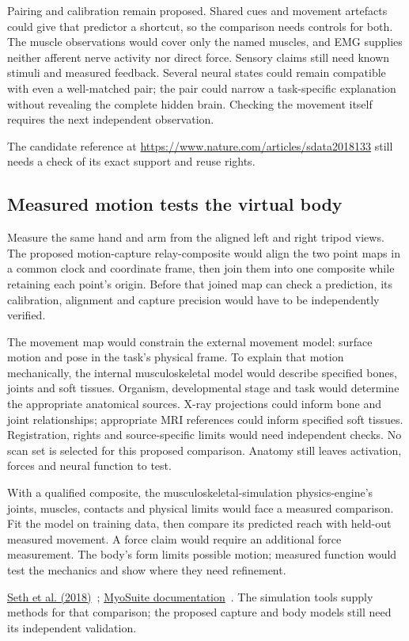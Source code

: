 Pairing and calibration remain proposed. Shared cues and movement artefacts
could give that predictor a shortcut, so the comparison needs controls for
both. The muscle observations would cover only the named muscles, and EMG
supplies neither afferent nerve activity nor direct force. Sensory claims
still need known stimuli and measured feedback. Several neural states could
remain compatible with even a well-matched pair; the pair could narrow a
task-specific explanation without revealing the complete hidden brain.
Checking the movement itself requires the next independent observation.
\par\noindent The candidate reference at \url{https://www.nature.com/articles/sdata2018133} still needs a check of its exact support and reuse rights.

\subsection{Measured motion tests the virtual body}
Measure the same hand and arm from the aligned left and right tripod views.
The proposed motion-capture relay-composite would align the two point maps
in a common clock and coordinate frame, then join them into one composite
while retaining each point's origin. Before that joined map can check a
prediction, its calibration, alignment and capture precision would have to
be independently verified.

The movement map would constrain the external movement model: surface motion
and pose in the task's physical frame. To explain that motion mechanically,
the internal musculoskeletal model would describe specified bones, joints
and soft tissues. Organism, developmental stage and task would determine the
appropriate anatomical sources. X-ray projections could inform bone and
joint relationships; appropriate MRI references could inform specified soft
tissues. Registration, rights and source-specific limits would need independent
checks. No scan set is selected for this proposed comparison. Anatomy still
leaves activation, forces and neural function to test.

With a qualified composite, the musculoskeletal-simulation physics-engine's
joints, muscles, contacts and physical limits would face a measured comparison.
Fit the model on training data, then compare its predicted reach with
held-out measured movement. A force claim would require an additional force
measurement. The body's form limits possible motion; measured function would
test the mechanics and show where they need refinement.
\par\noindent \href{https://journals.plos.org/ploscompbiol/article?id=10.1371/journal.pcbi.1006223}{Seth et al. (2018)}~\cite{opensim2018}; \href{https://myosuite.readthedocs.io/en/latest/}{MyoSuite documentation}~\cite{myosuiteDocsUndated}. The simulation tools supply methods for that comparison; the proposed capture and body models still need its independent validation.

